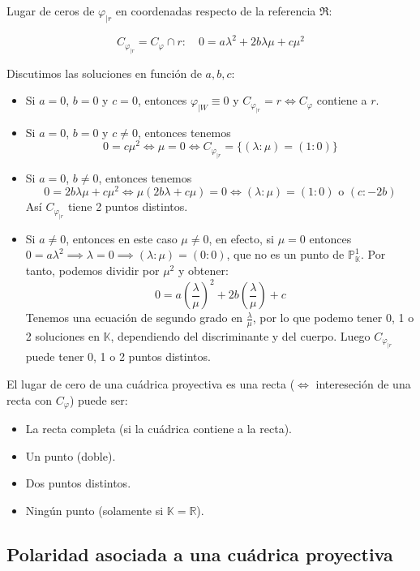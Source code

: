 Lugar de ceros de $\varphi_{|r}$ en coordenadas respecto de la referencia $\mathfrak{R}$:

\[
C_{\varphi_{|r}} = C_\varphi \cap r : \quad 0 = a \lambda^2 + 2 b \lambda \mu + c \mu^2
\]

Discutimos las soluciones en función de $a, b, c$:

\begin{itemize}
    \item Si $a = 0$, $b = 0$ y $c = 0$, entonces $\varphi_{|W} \equiv 0$ y $C_{\varphi_{|r}} = r \iff C_\varphi$ contiene a $r$.
    \item Si $a = 0$, $b = 0$ y $c \neq 0$, entonces tenemos
    \[
        0= c \mu^2 \iff \mu = 0 \iff C_{\varphi_{|r}} = \{ (\lambda : \mu) = (1 : 0) \}
    \] 
    \item Si $a = 0$, $b \neq 0$, entonces tenemos
    \[
        0 = 2 b \lambda \mu + c \mu^2 \iff
        \mu (2 b \lambda + c \mu) = 0 \iff (\lambda : \mu) =
        (1 : 0) \text{ o } (c : -2b)
    \]
    Así $C_{\varphi_{|r}}$ tiene 2 puntos distintos.
    \item Si $a \neq 0$, entonces en este caso $\mu \neq 0$, en efecto, si $\mu = 0$ entonces $0 = a \lambda^2 \implies \lambda = 0 \implies (\lambda : \mu) = (0 : 0)$, que no es un punto de $\mathbb{P}^1_\mathbb{K}$. Por tanto, podemos dividir por $\mu^2$ y obtener:
    \[
        0 = a \left( \frac{\lambda}{\mu} \right)^2 + 2 b \left( \frac{\lambda}{\mu} \right) + c
    \]
    Tenemos una ecuación de segundo grado en $\frac{\lambda}{\mu}$, por lo que podemo tener 0, 1 o 2 soluciones en $\mathbb{K}$, dependiendo del discriminante y del cuerpo. Luego $C_{\varphi_{|r}}$ puede tener 0, 1 o 2 puntos distintos.
\end{itemize}

El lugar de cero de una cuádrica proyectiva es una recta ($\iff$ intereseción de una recta con $C_{\varphi}$) puede ser:

\begin{itemize}
    \item La recta completa (si la cuádrica contiene a la recta).
    \item Un punto (doble).
    \item Dos puntos distintos.
    \item Ningún punto (solamente si $\mathbb{K} = \mathbb{R}$).
\end{itemize}


\subsection{Polaridad asociada a una cuádrica proyectiva}

